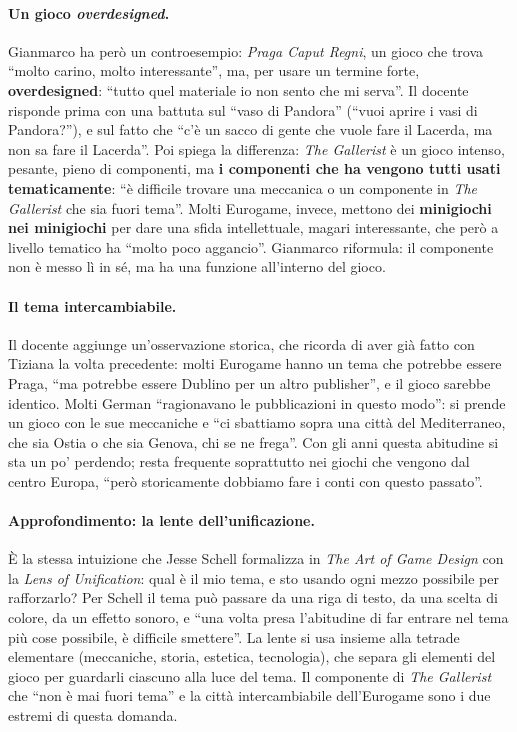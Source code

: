 \paragraph{Un gioco \emph{overdesigned}.} Gianmarco ha però un controesempio:
\emph{Praga Caput Regni}, un gioco che trova ``molto carino, molto interessante'',
ma, per usare un termine forte, \textbf{overdesigned}: ``tutto quel materiale io
non sento che mi serva''. Il docente risponde prima con una battuta sul ``vaso di
Pandora'' (``vuoi aprire i vasi di Pandora?''), e sul fatto che ``c'è un sacco di
gente che vuole fare il Lacerda, ma non sa fare il Lacerda''. Poi spiega la
differenza: \emph{The Gallerist} è un gioco intenso, pesante, pieno di componenti,
ma \textbf{i componenti che ha vengono tutti usati tematicamente}: ``è difficile
trovare una meccanica o un componente in \emph{The Gallerist} che sia fuori
tema''. Molti Eurogame, invece, mettono dei \textbf{minigiochi nei minigiochi} per
dare una sfida intellettuale, magari interessante, che però a livello tematico ha
``molto poco aggancio''. Gianmarco riformula: il componente non è messo lì in sé,
ma ha una funzione all'interno del gioco.

\paragraph{Il tema intercambiabile.} Il docente aggiunge un'osservazione storica,
che ricorda di aver già fatto con Tiziana la volta precedente: molti Eurogame hanno
un tema che potrebbe essere Praga, ``ma potrebbe essere Dublino per un altro
publisher'', e il gioco sarebbe identico. Molti German ``ragionavano le
pubblicazioni in questo modo'': si prende un gioco con le sue meccaniche e ``ci
sbattiamo sopra una città del Mediterraneo, che sia Ostia o che sia Genova, chi se
ne frega''. Con gli anni questa abitudine si sta un po' perdendo; resta frequente
soprattutto nei giochi che vengono dal centro Europa, ``però storicamente dobbiamo
fare i conti con questo passato''.

\paragraph{Approfondimento: la lente dell'unificazione.} È la stessa intuizione
che Jesse Schell formalizza in \emph{The Art of Game Design} con la
\emph{Lens of Unification}: qual è il mio tema, e sto usando ogni mezzo possibile
per rafforzarlo? Per Schell il tema può passare da una riga di testo, da una
scelta di colore, da un effetto sonoro, e ``una volta presa l'abitudine di far
entrare nel tema più cose possibile, è difficile smettere''. La lente si usa
insieme alla tetrade elementare (meccaniche, storia, estetica, tecnologia), che
separa gli elementi del gioco per guardarli ciascuno alla luce del tema. Il
componente di \emph{The Gallerist} che ``non è mai fuori tema'' e la città
intercambiabile dell'Eurogame sono i due estremi di questa domanda.

